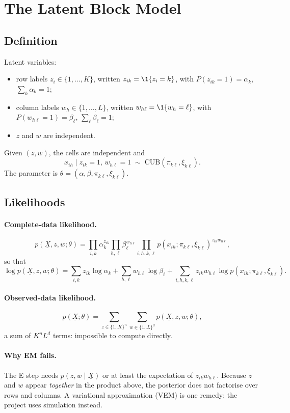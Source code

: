 \section{The Latent Block Model}

\subsection{Definition}

Latent variables:
\begin{itemize}
  \item row labels $z_i\in\{1,\ldots,K\}$, written $z_{ik}=\1\{z_i=k\}$,
  with $P(z_{ik}=1)=\alpha_k$, $\sum_k\alpha_k=1$;
  \item column labels $w_h\in\{1,\ldots,L\}$, written $w_{h\ell}=\1\{w_h=\ell\}$,
  with $P(w_{h\ell}=1)=\beta_\ell$, $\sum_\ell\beta_\ell=1$;
  \item $z$ and $w$ are independent.
\end{itemize}
Given $(z,w)$, the cells are independent and
\[
x_{ih}\mid z_{ik}=1,\,w_{h\ell}=1\;\sim\;\text{CUB}(\pi_{k\ell},\xi_{k\ell}).
\]
The parameter is $\theta=(\alpha,\beta,\pi_{k\ell},\xi_{k\ell})$.

\subsection{Likelihoods}

\paragraph{Complete-data likelihood.}
\[
p(\underline{X},z,w;\theta)
=
\prod_{i,k}\alpha_k^{z_{ik}}
\prod_{h,\ell}\beta_\ell^{w_{h\ell}}
\prod_{i,h,k,\ell}p(x_{ih};\pi_{k\ell},\xi_{k\ell})^{z_{ik}w_{h\ell}},
\]
so that
\[
\boxed{
\log p(\underline{X},z,w;\theta)
=
\sum_{i,k}z_{ik}\log\alpha_k
+\sum_{h,\ell}w_{h\ell}\log\beta_\ell
+\sum_{i,h,k,\ell}z_{ik}w_{h\ell}\log p(x_{ih};\pi_{k\ell},\xi_{k\ell}).
}
\]

\paragraph{Observed-data likelihood.}
\[
p(\underline{X};\theta)=\sum_{z\in\{1..K\}^n}\sum_{w\in\{1..L\}^d}
p(\underline{X},z,w;\theta),
\]
a sum of $K^nL^d$ terms: impossible to compute directly.

\paragraph{Why EM fails.}
The E step needs $p(z,w\mid\underline{X})$ or at least the expectation of
$z_{ik}w_{h\ell}$. Because $z$ and $w$ appear \emph{together} in the product
above, the posterior does not factorise over rows and columns. A
variational approximation (VEM) is one remedy; the project uses
simulation instead.

